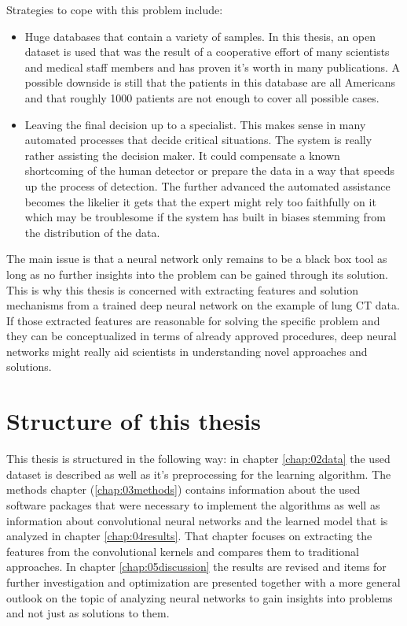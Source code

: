 \documentclass[main.tex]{subfiles}
\begin{document}
Strategies to cope with this problem include:
\begin{itemize}
\item Huge databases that contain a variety of samples. In this thesis, an open dataset is used that was
the result of a cooperative effort of many scientists and medical staff members and has proven
it's worth in many publications. A possible downside is still that the patients in this database are all Americans and that roughly 1000 patients are not enough to cover all possible cases.

\item Leaving the final decision up to a specialist. This makes sense in many automated processes that decide critical situations. The system is really rather assisting the decision maker. It could compensate a known shortcoming of the human detector or prepare the data in a way that speeds up the process of detection. The further advanced the automated assistance becomes the likelier it gets that the expert might rely too faithfully on it which may be troublesome if the system has built in biases stemming from the distribution of the data.
\end{itemize}

The main issue is that a neural network only remains to be a black box tool as long as no further insights into the problem can be gained through its solution. This is why this thesis is concerned with extracting features and solution mechanisms from a trained deep neural network on the example of lung CT data. If those extracted features are reasonable for solving the specific problem and they can be conceptualized in terms of already approved procedures, deep neural networks might really aid scientists in understanding novel approaches and solutions.

\section{Structure of this thesis}
This thesis is structured in the following way: in chapter \ref{chap:02data} the used dataset is described as well as it's preprocessing for the learning algorithm. The methods chapter (\ref{chap:03methods}) contains information about the used software packages that were necessary to implement the algorithms as well as information about convolutional neural networks and the learned model that is analyzed in chapter \ref{chap:04results}. That chapter focuses on extracting the features from the convolutional kernels and compares them to traditional approaches. In chapter \ref{chap:05discussion} the results are revised and items for further investigation and optimization are presented together with a more general outlook on the topic of analyzing neural networks to gain insights into problems and not just as solutions to them. 
\end{document}
